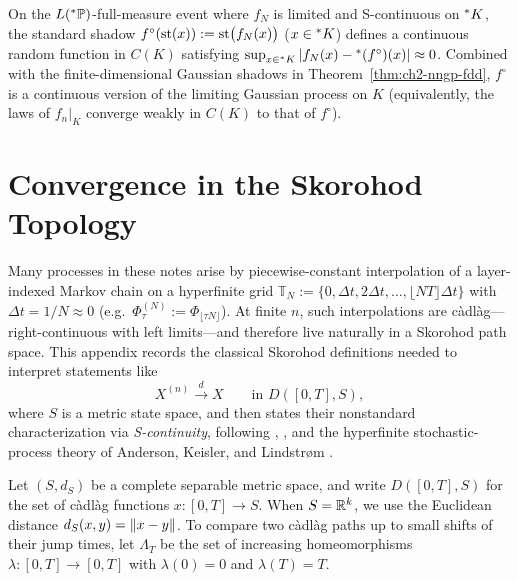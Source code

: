 \begin{remark}
\label{rem:holder-shadow}
On the $L({}^*\mathbb{P})$-full-measure event where $f_N$ is limited and S-continuous on ${}^*K$, the standard shadow $f^\circ(\operatorname{st}(x)) := \operatorname{st}\bigl(f_N(x)\bigr)$ ($x \in {}^*K$) defines a continuous random function in $C(K)$ satisfying $\sup_{x \in {}^*K} \left\lvert f_N(x) - {}^*(f^\circ)(x) \right\rvert \approx 0$. Combined with the finite-dimensional Gaussian shadows in Theorem~\ref{thm:ch2-nngp-fdd},
$f^\circ$ is a continuous version of the limiting Gaussian process on $K$ (equivalently, the laws of $f_n|_K$ converge weakly in $C(K)$ to that of $f^\circ$).
\end{remark}

\section{Convergence in the Skorohod Topology}
\label{sec:appa-skorohod}

Many processes in these notes arise by piecewise-constant interpolation of a layer-indexed Markov chain on a hyperfinite grid $\mathbb{T}_N := \{0, \Delta t, 2\Delta t, \dots, \lfloor NT \rfloor\Delta t\}$ with $\Delta t = 1/N \approx 0$ (e.g.\ $\Phi_\tau^{(N)} := \Phi_{\lfloor \tau N \rfloor}$). At finite $n$, such interpolations are c\`adl\`ag---right-continuous with left limits---and therefore live naturally in a Skorohod path space. This appendix records the classical Skorohod definitions needed to interpret statements like
\begin{equation}
\label{eq:appa-skorohod-conv}
X^{(n)} \xrightarrow{d} X \qquad \text{in } D([0, T], S),
\end{equation}
where $S$ is a metric state space, and then states their nonstandard characterization via \emph{S-continuity}, following \cite[Appendix A]{li2022neural}, \cite{ethier2009markov,kallenberg2021foundations}, and the hyperfinite stochastic-process theory of Anderson, Keisler, and Lindstr\o m \cite{anderson1976nonstandard,keisler1984infinitesimal,lindstrom1988invitation}.

Let $(S, d_S)$ be a complete separable metric space, and write $D([0, T], S)$ for the set of c\`adl\`ag functions $x : [0, T] \to S$. When $S = \mathbb{R}^k$, we use the Euclidean distance $d_S(x, y) = \left\lVert x - y \right\rVert$. To compare two c\`adl\`ag paths up to small shifts of their jump times, let $\Lambda_T$ be the set of increasing homeomorphisms $\lambda : [0, T] \to [0, T]$ with $\lambda(0) = 0$ and $\lambda(T) = T$.

